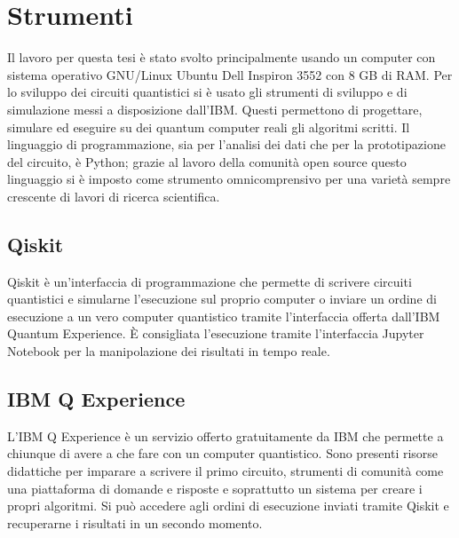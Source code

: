 \chapter{Strumenti}\label{ch:strumenti}

Il lavoro per questa tesi è stato svolto principalmente usando un computer 
con sistema operativo GNU/Linux Ubuntu Dell Inspiron 3552 con 8 GB di RAM. 
Per lo sviluppo dei circuiti quantistici si è usato gli strumenti di 
sviluppo e di simulazione messi a disposizione dall'IBM. Questi permettono 
di progettare, simulare ed eseguire su dei quantum computer reali gli 
algoritmi scritti. Il linguaggio di programmazione, sia per l'analisi 
dei dati che per la prototipazione del circuito, è Python; grazie al 
lavoro della comunità open source questo linguaggio si è imposto 
come strumento omnicomprensivo per una varietà sempre crescente di 
lavori di ricerca scientifica. 

\section{Qiskit}

Qiskit è un'interfaccia di programmazione che permette di scrivere 
circuiti quantistici e simularne l'esecuzione sul proprio computer 
o inviare un ordine di esecuzione a un vero computer quantistico tramite 
l'interfaccia offerta dall'IBM Quantum Experience. 
È consigliata l'esecuzione tramite l'interfaccia Jupyter Notebook per 
la manipolazione dei risultati in tempo reale. 

\section{IBM Q Experience}

L'IBM Q Experience è un servizio offerto gratuitamente da IBM che permette 
a chiunque di avere a che fare con un computer quantistico. Sono presenti 
risorse didattiche per imparare a scrivere il primo circuito, strumenti 
di comunità come una piattaforma di domande e risposte e soprattutto 
un sistema per creare i propri algoritmi. Si può accedere agli ordini di 
esecuzione inviati tramite Qiskit e recuperarne i risultati in un 
secondo momento. 